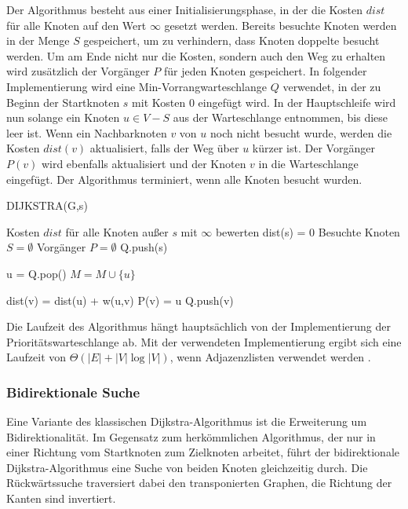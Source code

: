 Der Algorithmus besteht aus einer Initialisierungsphase, in der die Kosten $dist$ für alle Knoten
auf den Wert $\infty$ gesetzt werden. Bereits besuchte Knoten werden in der Menge $S$ gespeichert,
um zu verhindern, dass Knoten doppelte besucht werden. Um am Ende nicht nur die Kosten, sondern auch
den Weg zu erhalten wird zusätzlich der Vorgänger $P$ für jeden Knoten gespeichert. In folgender
Implementierung wird eine Min-Vorrangwarteschlange $Q$ verwendet, in der zu Beginn der Startknoten
$s$ mit Kosten 0 eingefügt wird. In der Hauptschleife wird nun solange ein Knoten $u \in V - S$ aus
der Warteschlange entnommen, bis diese leer ist. Wenn ein Nachbarknoten $v$ von $u$ noch nicht
besucht wurde, werden die Kosten $dist(v)$ aktualisiert, falls der Weg über $u$ kürzer ist. Der
Vorgänger $P(v)$ wird ebenfalls aktualisiert und der Knoten $v$ in die Warteschlange eingefügt. Der
Algorithmus  terminiert, wenn alle Knoten besucht wurden.
\begin{algorithm}[H]
    \caption{DIJKSTRA(G,s)}
    \label{algo:dijkstra}
    \begin{algorithmic}
        \State Kosten $dist$ für alle Knoten außer $s$ mit $\infty$ bewerten
        \State dist(s) = 0
        \State Besuchte Knoten $S = \emptyset$
        \State Vorgänger $P = \emptyset$
        \State Q.push(s)

        \State u = Q.pop()
        \State $M = M \cup \{u\}$

        \State dist(v) = dist(u) + w(u,v)
        \State P(v) = u
        \State Q.push(v)
        \EndIf
        \EndFor
        \EndWhile
    \end{algorithmic}
\end{algorithm}
Die Laufzeit des Algorithmus hängt hauptsächlich von der Implementierung der Prioritätswarteschlange
ab. Mit der verwendeten Implementierung ergibt sich eine Laufzeit von $\Theta(|E| + |V| \log |V|)$,
wenn Adjazenzlisten verwendet werden \cite{intro.algo}.


\subsubsection{Bidirektionale Suche}
Eine Variante des klassischen Dijkstra-Algorithmus ist die Erweiterung um Bidirektionalität.
Im Gegensatz zum herkömmlichen Algorithmus, der nur in einer Richtung vom Startknoten zum Zielknoten
arbeitet, führt der bidirektionale Dijkstra-Algorithmus eine Suche von beiden Knoten gleichzeitig
durch. Die Rückwärtssuche traversiert dabei den transponierten Graphen, \dH die Richtung der Kanten
sind invertiert.

